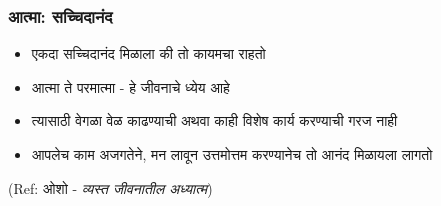\begin{frame}[fragile]\frametitle{आत्मा: सच्चिदानंद}

	\begin{itemize}
	\item एकदा सच्चिदानंद मिळाला की तो कायमचा राहतो
	\item आत्मा ते परमात्मा - हे जीवनाचे ध्येय आहे
	\item त्यासाठी वेगळा वेळ काढण्याची अथवा काही विशेष कार्य करण्याची गरज नाही
	\item आपलेच काम अजगतेने, मन लावून उत्तमोत्तम करण्यानेच तो आनंद मिळायला लागतो
	\end{itemize}

{\tiny (Ref: ओशो - \textit{व्यस्त जीवनातील अध्यात्म})}

\end{frame}
